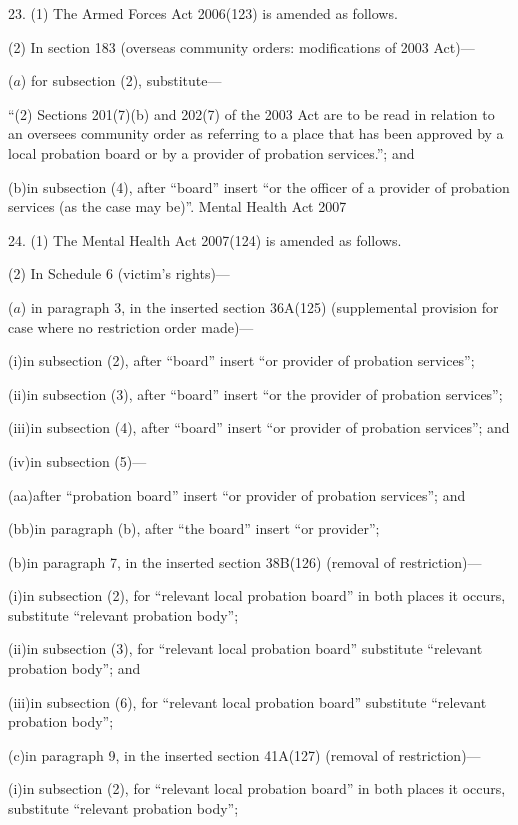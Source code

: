 \documentclass[12pt,a4paper]{article}
\begin{document}
23.  (1)  The Armed Forces Act 2006(123) is amended as follows.

(2) In section 183 (overseas community orders: modifications of 2003 Act)—

($a$) for subsection (2), substitute—

“(2) Sections 201(7)(b) and 202(7) of the 2003 Act are to be read in relation to an oversees community order as referring to a place that has been approved by a local probation board or by a provider of probation services.”; and

(b)in subsection (4), after “board” insert “or the officer of a provider of probation services (as the case may be)”.
Mental Health Act 2007

24.  (1)  The Mental Health Act 2007(124) is amended as follows.

(2) In Schedule 6 (victim’s rights)—

($a$) in paragraph 3, in the inserted section 36A(125) (supplemental provision for case where no restriction order made)—

(i)in subsection (2), after “board” insert “or provider of probation services”;

(ii)in subsection (3), after “board” insert “or the provider of probation services”;

(iii)in subsection (4), after “board” insert “or provider of probation services”; and

(iv)in subsection (5)—

(aa)after “probation board” insert “or provider of probation services”; and

(bb)in paragraph (b), after “the board” insert “or provider”;

(b)in paragraph 7, in the inserted section 38B(126) (removal of restriction)—

(i)in subsection (2), for “relevant local probation board” in both places it occurs, substitute “relevant probation body”;

(ii)in subsection (3), for “relevant local probation board” substitute “relevant probation body”; and

(iii)in subsection (6), for “relevant local probation board” substitute “relevant probation body”;

(c)in paragraph 9, in the inserted section 41A(127) (removal of restriction)—

(i)in subsection (2), for “relevant local probation board” in both places it occurs, substitute “relevant probation body”;
\end{document}
